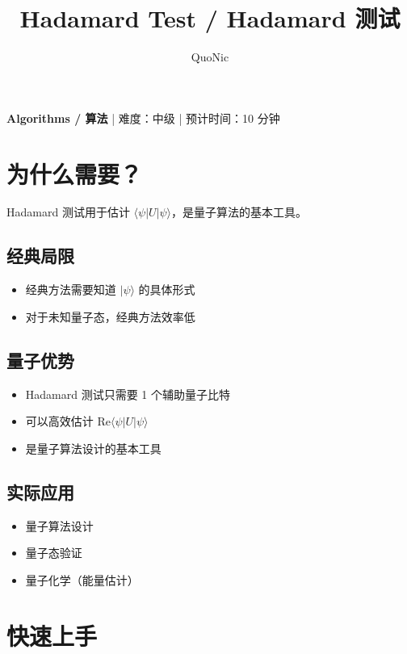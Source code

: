 \documentclass[12pt,a4paper]{article}
\title{Hadamard Test / Hadamard 测试}
\author{QuoNic}
\date{}
\begin{document}
\maketitle

\begin{center}
\textbf{Algorithms / 算法} | 难度：中级 | 预计时间：10 分钟
\end{center}

\tableofcontents
\newpage

\section{为什么需要？}

Hadamard 测试用于估计 $\langle\psi|U|\psi\rangle$，是量子算法的基本工具。

\subsection{经典局限}
\begin{itemize}
  \item 经典方法需要知道 $|\psi\rangle$ 的具体形式
  \item 对于未知量子态，经典方法效率低
\end{itemize}

\subsection{量子优势}
\begin{itemize}
  \item Hadamard 测试只需要 1 个辅助量子比特
  \item 可以高效估计 $\text{Re}\langle\psi|U|\psi\rangle$
  \item 是量子算法设计的基本工具
\end{itemize}

\subsection{实际应用}
\begin{itemize}
  \item 量子算法设计
  \item 量子态验证
  \item 量子化学（能量估计）
\end{itemize}

\section{快速上手}
\end{document}
